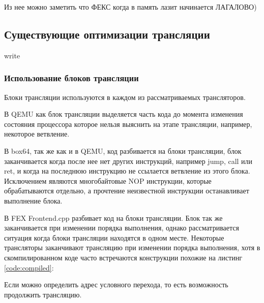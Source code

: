 Из нее можно заметить что ФЕКС когда в память лазит начинается ЛАГАЛОВО)

\subsection{Существующие оптимизации трансляции}

write

\subsubsection{Использование блоков трансляции}

Блоки трансляции используются в каждом из рассматриваемых трансляторов.

В QEMU как блок трансляции выделяется часть кода до момента изменения состояния процессора которое нельзя выяснить на этапе трансляции, например, некоторое ветвление. \cite{qemu_docs}

В box64, так же как и в QEMU, код разбивается на блоки трансляции, блок заканчивается когда после нее нет других инструкций, например jump, call или ret, и когда на последнюю инструкцию не ссылается ветвление из этого блока. Исключением являются многобайтовые NOP инструкции, которые обрабатываются отдельно, а прочтение неизвестной инструкции останавливает выполнение блока. \cite{box64_letter}

В FEX Frontend.cpp разбивает код на блоки трансляции. Блок так же заканчивается при изменении порядка выполнения, однако рассматривается ситуация когда блоки трансляции находятся в одном месте. Некоторые трансляторы заканчивают трансляцию при изменении порядка выполнения, хотя в скомпилированном коде часто встречаются конструкции похожие на листинг \ref{code:compiled}:


Если можно определить адрес условного перехода, то есть возможность продолжить трансляцию. \cite{fex_front}

